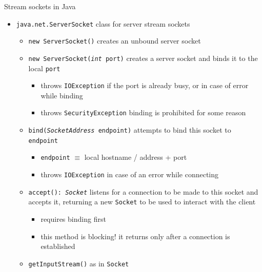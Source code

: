 \documentclass{beamer}\mode<presentation>{\usetheme{AMSBolognaFC}}
\begin{document}
\begin{frame}[c, allowframebreaks]{Stream sockets in Java}
\begin{itemize}
        \framebreak

        \item \texttt{java.net.\alert{ServerSocket}} class for \alert{server} stream sockets 
        \begin{itemize}
            \item \alert{\texttt{new ServerSocket()}} creates an unbound server socket
            \item \alert{\texttt{new ServerSocket(\textit{int} port)}} creates a server socket and binds it to the local \texttt{port}
            \begin{itemize}
                \item throws \texttt{IOException} if the port is already busy, or in case of error while binding
                \item throws \texttt{SecurityException} binding is prohibited for some reason
            \end{itemize}

            \item \alert{\texttt{bind(\textit{SocketAddress} endpoint)}} attempts to bind this socket to \texttt{endpoint}
            \begin{itemize}
                \item \texttt{endpoint} $\equiv$ local hostname / address + port
                \item throws \texttt{IOException} in case of an error while connecting
            \end{itemize}

            \item \alert{\texttt{accept(): \textit{Socket}}} listens for a connection to be made to this socket and accepts it, returning a new \texttt{Socket} to be used to interact with the client
            \begin{itemize}
                \item requires binding first
                \item this method is blocking! it returns only after a connection is established
            \end{itemize}

            \framebreak

            \item \alert{\texttt{getInputStream()}} as in \texttt{Socket}


\end{itemize}
\end{itemize}
\end{frame}
\end{document}
